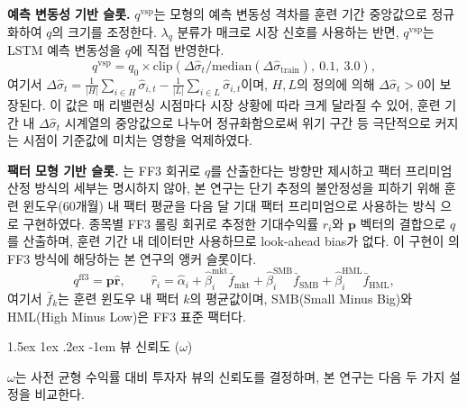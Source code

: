 \documentclass[eng]{kjas3}
\makeatletter
\newcommand\paragraph{\@startsection{paragraph}{4}{\z@}%
    {1.5ex \@plus1ex \@minus.2ex}%
    {-1em}%
    {\normalfont\normalsize\bfseries}}
\makeatother
\begin{document}
\textbf{예측 변동성 기반 슬롯.} $q^{\mathrm{vsp}}$는 모형의 예측 변동성 격차를 훈련 기간 중앙값으로 정규화하여 $q$의 크기를 조정한다. $\lambda_q$ 분류가 매크로 시장 신호를 사용하는 반면, $q^{\mathrm{vsp}}$는 LSTM 예측 변동성을 $q$에 직접 반영한다.
\begin{equation}
  q^{\mathrm{vsp}} = q_0 \times \mathrm{clip}\!\left(\Delta\hat{\sigma}_t/\mathrm{median}(\Delta\hat{\sigma}_{\mathrm{train}}),\ 0.1,\ 3.0\right),
\end{equation}
여기서 $\Delta\hat{\sigma}_t = \frac{1}{|H|}\sum_{i\in H}\hat{\sigma}_{i,t} - \frac{1}{|L|}\sum_{i\in L}\hat{\sigma}_{i,t}$이며, $H, L$의 정의에 의해 $\Delta\hat{\sigma}_t > 0$이 보장된다. 이 값은 매 리밸런싱 시점마다 시장 상황에 따라 크게 달라질 수 있어, 훈련 기간 내 $\Delta\hat{\sigma}_t$ 시계열의 중앙값으로 나누어 정규화함으로써 위기 구간 등 극단적으로 커지는 시점이 기준값에 미치는 영향을 억제하였다.

\textbf{팩터 모형 기반 슬롯.} \citet{pyo2018}는 FF3 회귀로 $q$를 산출한다는 방향만 제시하고 팩터 프리미엄 산정 방식의 세부는 명시하지 않아, 본 연구는 단기 추정의 불안정성을 피하기 위해 훈련 윈도우(60개월) 내 팩터 평균을 다음 달 기대 팩터 프리미엄으로 사용하는 방식 \citep{fama1973risk, cochrane2005} 으로 구현하였다. 종목별 FF3 롤링 회귀로 추정한 기대수익률 $\hat{r}_i$와 $\mathbf{p}$ 벡터의 결합으로 $q$를 산출하며, 훈련 기간 내 데이터만 사용하므로 look-ahead bias가 없다. 이 구현이 \citet{pyo2018}의 FF3 방식에 해당하는 본 연구의 앵커 슬롯이다.
\begin{equation}
  q^{\mathrm{ff3}} = \mathbf{p}\hat{\mathbf{r}}, \qquad
  \hat{r}_i = \hat{\alpha}_i + \hat{\beta}_i^{\mathrm{mkt}}\bar{f}_{\mathrm{mkt}} + \hat{\beta}_i^{\mathrm{SMB}}\bar{f}_{\mathrm{SMB}} + \hat{\beta}_i^{\mathrm{HML}}\bar{f}_{\mathrm{HML}},
\end{equation}
여기서 $\bar{f}_k$는 훈련 윈도우 내 팩터 $k$의 평균값이며, SMB(Small Minus Big)와 HML(High Minus Low)은 FF3 표준 팩터다.

\paragraph{뷰 신뢰도 ($\omega$)}

$\omega$는 사전 균형 수익률 대비 투자자 뷰의 신뢰도를 결정하며, 본 연구는 다음 두 가지 설정을 비교한다.
\end{document}
